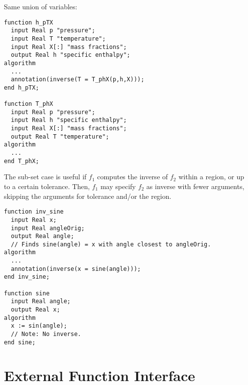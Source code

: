 \begin{example}
Same union of variables:
\begin{lstlisting}[language=modelica]
function h_pTX
  input Real p "pressure";
  input Real T "temperature";
  input Real X[:] "mass fractions";
  output Real h "specific enthalpy";
algorithm
  ...
  annotation(inverse(T = T_phX(p,h,X)));
end h_pTX;

function T_phX
  input Real p "pressure";
  input Real h "specific enthalpy";
  input Real X[:] "mass fractions";
  output Real T "temperature";
algorithm
  ...
end T_phX;
\end{lstlisting}
\end{example}

The sub-set case is useful if $f_1$ computes the inverse of $f_2$ within a region, or up to a certain tolerance.
Then, $f_1$ may specify $f_2$ as inverse with fewer arguments, skipping the arguments for tolerance and/or the region.

\begin{example}

\begin{lstlisting}[language=modelica]
function inv_sine
  input Real x;
  input Real angleOrig;
  output Real angle;
  // Finds sine(angle) = x with angle closest to angleOrig.
algorithm
  ...
  annotation(inverse(x = sine(angle)));
end inv_sine;

function sine
  input Real angle;
  output Real x;
algorithm
  x := sin(angle);
  // Note: No inverse.
end sine;
\end{lstlisting}
\end{example}

\section{External Function Interface}\label{external-function-interface}

